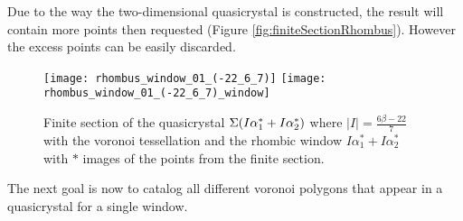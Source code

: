 \documentclass[text.tex]{subfiles}
\begin{document}
\begin{remark}
Due to the way the two-dimensional quasicrystal is constructed, the result will contain more points then requested (Figure \ref{fig:finiteSectionRhombus}). However the excess points can be easily discarded.
\end{remark}

\begin{figure}[h]
\centering
\texttt{[image: rhombus\_window\_01\_(-22\_6\_7)]}
\texttt{[image: rhombus\_window\_01\_(-22\_6\_7)\_window]}
\caption{Finite section of the quasicrystal $\Sigma(I\alpha_1^\ast + I\alpha_2^\ast)$ where $|I| = \frac{6\beta-22}{7}$ with the voronoi tessellation and the rhombic window $I\alpha_1^\ast + I\alpha_2^\ast$ with $\ast$ images of the points from the finite section.}
\label{fig:finiteSectionQuasi}
\end{figure}

The next goal is now to catalog all different voronoi polygons that appear in a quasicrystal for a single window. 
\end{document}
